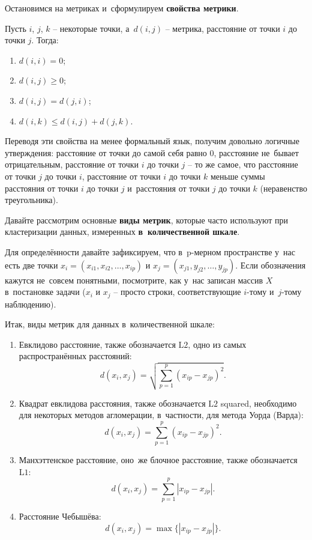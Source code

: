 \documentclass[12pt,a4paper]{article}
\theoremstyle{definition}
\begin{document}
Остановимся на метриках и~сформулируем \textbf{свойства метрики}.

Пусть $i$, $j$, $k$ – некоторые точки, а~$d(i, j)$ – метрика, расстояние 
от точки $i$ до точки $j$. Тогда:

\begin{enumerate}
\item $d(i, i) = 0$;
\item $d(i, j) \geqslant 0$;
\item $d(i, j) = d(j, i)$;
\item $d(i, k) \leqslant d(i, j) + d(j, k)$.
\end{enumerate}

Переводя эти свойства на менее формальный язык, получим довольно логичные утверждения: 
расстояние от точки до самой себя равно $0$, расстояние не~бывает отрицательным, расстояние 
от точки $i$ до точки $j$ – то же самое, что расстояние от точки $j$ до точки $i$, 
расстояние от точки $i$ до точки $k$ меньше суммы расстояния от точки $i$ до точки $j$ 
и~расстояния от точки $j$ до точки $k$ (неравенство треугольника).

Давайте рассмотрим основные \textbf{виды метрик}, которые часто используют при 
кластеризации данных, измеренных \textbf{в~количественной шкале}.

Для определённости давайте зафиксируем, что в~$\text{p}$-мерном пространстве у~нас 
есть две точки $x_i = (x_{i1}, x_{i2}, \dots, x_{ip})$ и $x_j = (x_{j1}, y_{j2}, \dots, y_{jp})$. 
Если обозначения кажутся не~совсем понятными, посмотрите, как у~нас записан массив $X$
в~постановке задачи ($x_i$ и $x_j$ – просто строки, соответствующие $i$-тому 
и~$j$-тому наблюдению). 

Итак, виды метрик для данных в~количественной шкале:

\begin{enumerate}
\item Евклидово расстояние, также обозначается $\text{L2}$, одно из самых 
распространённых расстояний:
$$
d(x_i, x_j) = \sqrt{\sum_{p=1}^{p} (x_{ip} - x_{jp}) ^2}.
$$
\item Квадрат евклидова расстояния, также обозначается $\text{L2}$ squared, 
необходимо для некоторых методов агломерации, в~частности, для метода Уорда (Варда):
$$
d(x_i, x_j) = \sum_{p=1}^{p} (x_{ip} - x_{jp}) ^2.
$$
\item Манхэттенское расстояние, оно~же блочное расстояние, также обозначается $\text{L1}$:
$$
d(x_i, x_j) = \sum_{p=1}^{p} |x_{ip} - x_{jp}|.
$$
\item Расстояние Чебышёва:
$$
d(x_i, x_j) = \max\{|x_{ip} - x_{jp}|\}.
$$
\end{enumerate}
\end{document}
